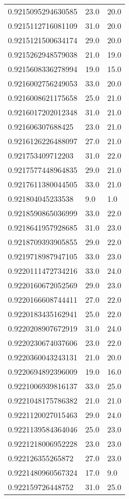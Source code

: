 \begin{center}
\begin{supertabular}[H]{p{0.30\textwidth}p{0.05\textwidth}p{0.05\textwidth}}
0.9215095294630585 & 23.0 & 20.0 \\ 
0.9215112716081109 & 31.0 & 20.0 \\ 
0.9215121500634174 & 29.0 & 20.0 \\ 
0.9215262948579038 & 21.0 & 19.0 \\ 
0.9215608336278994 & 19.0 & 15.0 \\ 
0.9216002756249053 & 33.0 & 20.0 \\ 
0.9216008621175658 & 25.0 & 21.0 \\ 
0.9216017202012348 & 31.0 & 21.0 \\ 
0.921606307688425 & 23.0 & 21.0 \\ 
0.9216126226488097 & 27.0 & 21.0 \\ 
0.921753409712203 & 31.0 & 22.0 \\ 
0.9217577448964835 & 29.0 & 21.0 \\ 
0.9217611380044505 & 33.0 & 21.0 \\ 
0.921804045233538 & 9.0 & 1.0 \\ 
0.9218590865036999 & 33.0 & 22.0 \\ 
0.9218641957928685 & 31.0 & 23.0 \\ 
0.9218709393905855 & 29.0 & 22.0 \\ 
0.9219718987947105 & 33.0 & 23.0 \\ 
0.9220111472734216 & 33.0 & 24.0 \\ 
0.9220160672052569 & 29.0 & 23.0 \\ 
0.9220166608744411 & 27.0 & 22.0 \\ 
0.9220183435162941 & 25.0 & 22.0 \\ 
0.9220208907672919 & 31.0 & 24.0 \\ 
0.9220230674037606 & 23.0 & 22.0 \\ 
0.9220360043243131 & 21.0 & 20.0 \\ 
0.9220694892396009 & 19.0 & 16.0 \\ 
0.9221006939816137 & 33.0 & 25.0 \\ 
0.9221048175786382 & 21.0 & 21.0 \\ 
0.9221120027015463 & 29.0 & 24.0 \\ 
0.9221139584364046 & 25.0 & 23.0 \\ 
0.9221218006952228 & 23.0 & 23.0 \\ 
0.922126355265872 & 27.0 & 23.0 \\ 
0.9221480960567324 & 17.0 & 9.0 \\ 
0.922159726448752 & 31.0 & 25.0 \\ 

\end{supertabular}
\end{center}
